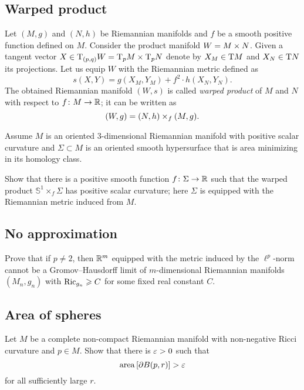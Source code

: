 \subsection*{Warped product}
\label{Warped product}
\label{page:warped product}

Let $(M,g)$ and $(N,h)$ be Riemannian manifolds 
and $f$ be a smooth positive function defined on $M$.
Consider the product manifold $W\z=M\times N$.
Given a tangent vector 
$X\z\in \T_{(p,q)} W
\z=\T_p M\times \T_p N$ denote by 
$X_M\z\in \T M$ and $X_N\z\in \T N$ its projections.
Let us equip $W$ with the Riemannian metric defined as
\[s(X,Y)=g(X_M,Y_M)+f^2\cdot h(X_N,Y_N).\]
The obtained Riemannian manifold $(W,s)$ is called \emph{warped product} of $M$ and $N$ with respect to $f\colon M\to \mathbb{R}$;
it can be written as  
\[(W,g)\z=(N,h)\times_f(M,g).\]

\begin{pr}
Assume $M$ is an oriented 3-dimensional Riemannian manifold with positive scalar curvature 
and $\Sigma\subset M$ is an oriented smooth hypersurface that is area minimizing in its homology class.

Show that there is a positive smooth function $f\colon\Sigma\to \mathbb{R}$
such that the warped product $\mathbb S^1\times_f \Sigma$
has positive scalar curvature;
here $\Sigma$ is equipped with the Riemannian metric
induced from $M$.
\end{pr}

\subsection*{No approximation\many}
\label{No approximation}

\begin{pr}
Prove that 
if $p\not=2$,
then $\mathbb{R}^m$ 
equipped with the metric induced by the $\ell^p$-norm 
cannot be a
Gromov--Hausdorff limit of
$m$-dimensional Riemannian manifolds $(M_n,g_n)$ with $\Ric_{g_n}\z\ge C$ for some fixed real constant $C$.
\end{pr}

\subsection*{Area of spheres}
\label{Area of spheres}

\begin{pr}
Let $M$ be a complete non-compact Riemannian manifold 
with non-negative Ricci curvature and $p\in M$.
Show that there is $\varepsilon>0$ such that 
$$\operatorname{\rm area}\nolimits\left[\partial B(p,r)\right]>\varepsilon$$
for all sufficiently large $r$.
\end{pr}

